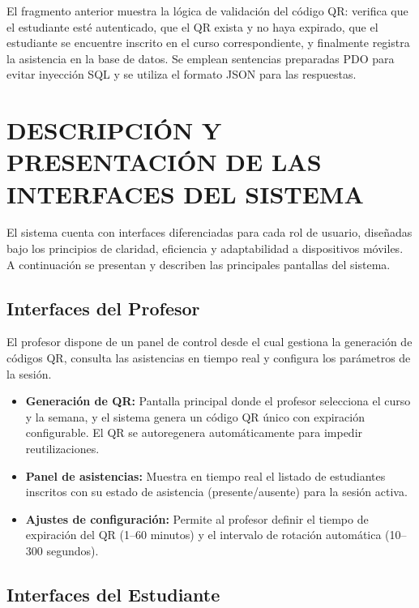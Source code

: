 \documentclass[12pt, letterpaper, oneside]{report}
\begin{document}
El fragmento anterior muestra la l\'ogica de validaci\'on del c\'odigo QR: verifica que el estudiante est\'e autenticado, que el QR exista y no haya expirado, que el estudiante se encuentre inscrito en el curso correspondiente, y finalmente registra la asistencia en la base de datos. Se emplean sentencias preparadas PDO para evitar inyecci\'on SQL y se utiliza el formato JSON para las respuestas.

\newpage

\chapter{DESCRIPCI\'ON Y PRESENTACI\'ON DE LAS\\INTERFACES DEL SISTEMA}

El sistema cuenta con interfaces diferenciadas para cada rol de usuario, dise\~nadas bajo los principios de claridad, eficiencia y adaptabilidad a dispositivos m\'oviles. A continuaci\'on se presentan y describen las principales pantallas del sistema.

\section{Interfaces del Profesor}

El profesor dispone de un panel de control desde el cual gestiona la generaci\'on de c\'odigos QR, consulta las asistencias en tiempo real y configura los par\'ametros de la sesi\'on.

\begin{itemize}
  \item \textbf{Generaci\'on de QR:} Pantalla principal donde el profesor selecciona el curso y la semana, y el sistema genera un c\'odigo QR \'unico con expiraci\'on configurable. El QR se autoregenera autom\'aticamente para impedir reutilizaciones.
  \item \textbf{Panel de asistencias:} Muestra en tiempo real el listado de estudiantes inscritos con su estado de asistencia (presente/ausente) para la sesi\'on activa.
  \item \textbf{Ajustes de configuraci\'on:} Permite al profesor definir el tiempo de expiraci\'on del QR (1--60 minutos) y el intervalo de rotaci\'on autom\'atica (10--300 segundos).
\end{itemize}

\section{Interfaces del Estudiante}
\end{document}
